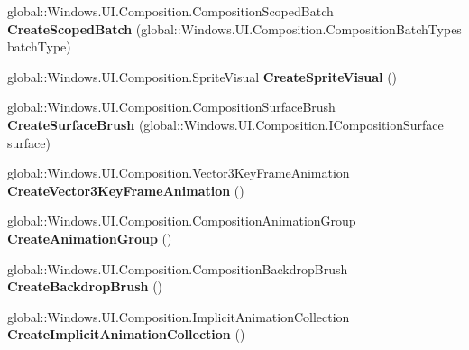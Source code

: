 \begin{DoxyCompactItemize}
\item 
\mbox{\label{class_windows_1_1_u_i_1_1_composition_1_1_compositor_a7ffb728cfd21a486270b346127894097}} 
global\+::\+Windows.\+U\+I.\+Composition.\+Composition\+Scoped\+Batch {\bfseries Create\+Scoped\+Batch} (global\+::\+Windows.\+U\+I.\+Composition.\+Composition\+Batch\+Types batch\+Type)
\item 
\mbox{\label{class_windows_1_1_u_i_1_1_composition_1_1_compositor_a74d76a5f9c181cabe102c81e114500ca}} 
global\+::\+Windows.\+U\+I.\+Composition.\+Sprite\+Visual {\bfseries Create\+Sprite\+Visual} ()
\item 
\mbox{\label{class_windows_1_1_u_i_1_1_composition_1_1_compositor_a281e5812822cbd2bb26434f086f15fc2}} 
global\+::\+Windows.\+U\+I.\+Composition.\+Composition\+Surface\+Brush {\bfseries Create\+Surface\+Brush} (global\+::\+Windows.\+U\+I.\+Composition.\+I\+Composition\+Surface surface)
\item 
\mbox{\label{class_windows_1_1_u_i_1_1_composition_1_1_compositor_af205bcd47f5aca9d484b62336a89d804}} 
global\+::\+Windows.\+U\+I.\+Composition.\+Vector3\+Key\+Frame\+Animation {\bfseries Create\+Vector3\+Key\+Frame\+Animation} ()
\item 
\mbox{\label{class_windows_1_1_u_i_1_1_composition_1_1_compositor_a80a2b13bdd26b7fead234728f4e048a4}} 
global\+::\+Windows.\+U\+I.\+Composition.\+Composition\+Animation\+Group {\bfseries Create\+Animation\+Group} ()
\item 
\mbox{\label{class_windows_1_1_u_i_1_1_composition_1_1_compositor_a718536eab5dc7541088008ef9798ad19}} 
global\+::\+Windows.\+U\+I.\+Composition.\+Composition\+Backdrop\+Brush {\bfseries Create\+Backdrop\+Brush} ()
\item 
\mbox{\label{class_windows_1_1_u_i_1_1_composition_1_1_compositor_a24135a36c54df364a599ced5e16e5440}} 
global\+::\+Windows.\+U\+I.\+Composition.\+Implicit\+Animation\+Collection {\bfseries Create\+Implicit\+Animation\+Collection} ()

\end{DoxyCompactItemize}
